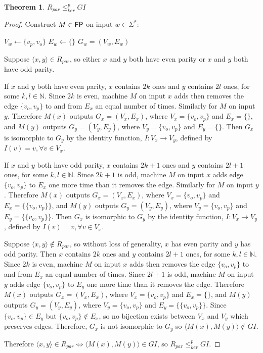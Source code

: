 \documentclass{article}
\newtheorem{theorem}{Theorem}[section]
\theoremstyle{definition} \newtheorem{definition}[definition]{Definition}
\newcommand{\sigmastar}{\Sigma^{*}} %
\newcommand{\kr}{\leq^{p}_{ker}} %
\newcommand{\pair}[2]{\langle#1,#2\rangle} %
\begin{document}
\begin{theorem}\label{thm:rpar_gi}$R_{par}\kr GI$\end{theorem}
\begin{proof}
  Construct $M\in {\ensuremath{\mathsf{FP}}}$ on input $w\in\sigmastar$:\\
  \begin{algorithm}[H]
    $V_w\gets\{v_p, v_o\}$\;
    $E_w\gets\{\}$\;
    \Return $G_w=(V_w, E_w)$
  \end{algorithm}

  Suppose $\pair{x}{y}\in R_{par}$, so either $x$ and $y$ both have even parity
  or $x$ and $y$ both have odd parity.

  If $x$ and $y$ both have even parity, $x$ contains $2k$ ones and $y$ contains
  $2l$ ones, for some $k,l\in\mathbb{N}$. Since $2k$ is even, machine $M$ on
  input $x$ adds then removes the edge $\{v_o, v_p\}$ to and from $E_x$ an
  equal number of times. Similarly for $M$ on input $y$. Therefore $M(x)$
  outputs $G_x=(V_x, E_x)$, where $V_x=\{v_o, v_p\}$ and $E_x=\{\}$, and $M(y)$
  outputs $G_y=(V_y, E_y)$, where $V_y=\{v_o, v_p\}$ and $E_y=\{\}$. Then $G_x$
  is isomorphic to $G_y$ by the identity function, $I\colon V_x\to V_y$,
  defined by $I(v)=v, \forall v\in V_x$.

  If $x$ and $y$ both have odd parity, $x$ contains $2k+1$ ones and $y$
  contains $2l+1$ ones, for some $k,l\in\mathbb{N}$. Since $2k+1$ is odd,
  machine $M$ on input $x$ adds edge $\{v_o, v_p\}$ to $E_x$ one more time than
  it removes the edge. Similarly for $M$ on input $y$. Therefore $M(x)$ outputs
  $G_x=(V_x, E_x)$, where $V_x=\{v_o, v_p\}$ and $E_x=\{\{v_o, v_p\}\}$, and
  $M(y)$ outputs $G_y=(V_y, E_y)$, where $V_y=\{v_o, v_p\}$ and $E_y=\{\{v_o,
  v_p\}\}$. Then $G_x$ is isomorphic to $G_y$ by the identity function,
  $I\colon V_x\to V_y$, defined by $I(v)=v, \forall v\in V_x$.

  Suppose $\pair{x}{y}\notin R_{par}$, so without loss of generality, $x$ has
  even parity and $y$ has odd parity. Then $x$ contains $2k$ ones and $y$
  contains $2l+1$ ones, for some $k,l\in\mathbb{N}$. Since $2k$ is even,
  machine $M$ on input $x$ adds then removes the edge $\{v_o, v_p\}$ to and
  from $E_x$ an equal number of times. Since $2l+1$ is odd, machine $M$ on
  input $y$ adds edge $\{v_o, v_p\}$ to $E_y$ one more time than it removes the
  edge. Therefore $M(x)$ outputs $G_x=(V_x, E_x)$, where $V_x=\{v_o, v_p\}$ and
  $E_x=\{\}$, and $M(y)$ outputs $G_y=(V_y, E_y)$, where $V_y=\{v_o, v_p\}$ and
  $E_y=\{\{v_o, v_p\}\}$. Since $\{v_o, v_p\}\in E_y$ but $\{v_o, v_p\}\notin
  E_x$, so no bijection exists between $V_x$ and $V_y$ which preserves
  edges. Therefore, $G_x$ is not isomorphic to $G_y$ so
  $\pair{M(x)}{M(y)}\notin GI$.

  Therefore $\pair{x}{y}\in R_{par} \iff \pair{M(x)}{M(y)} \in GI$, so $R_{par}
  \kr GI$.
\end{proof}
\end{document}
